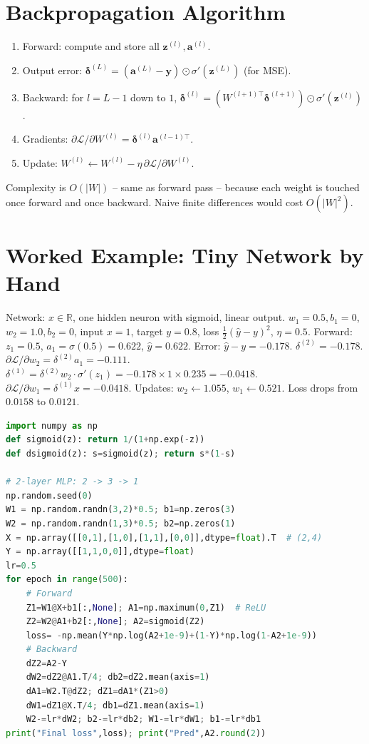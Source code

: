 \section{Backpropagation Algorithm}
\begin{enumerate}[leftmargin=1.2em]
\item Forward: compute and store all $\mathbf{z}^{(l)},\mathbf{a}^{(l)}$.
\item Output error: $\boldsymbol{\delta}^{(L)} = (\mathbf{a}^{(L)}-\mathbf{y})\odot\sigma'(\mathbf{z}^{(L)})$ (for MSE).
\item Backward: for $l=L-1$ down to $1$, $\boldsymbol{\delta}^{(l)}=(W^{(l+1)\top}\boldsymbol{\delta}^{(l+1)})\odot\sigma'(\mathbf{z}^{(l)})$.
\item Gradients: $\partial\mathcal{L}/\partial W^{(l)}=\boldsymbol{\delta}^{(l)}\mathbf{a}^{(l-1)\top}$.
\item Update: $W^{(l)}\leftarrow W^{(l)}-\eta\,\partial\mathcal{L}/\partial W^{(l)}$.
\end{enumerate}

Complexity is $O(|W|)$ -- same as forward pass -- because each weight is touched once forward and once backward. Naive finite differences would cost $O(|W|^2)$.

\section{Worked Example: Tiny Network by Hand}
Network: $x\in\mathbb{R}$, one hidden neuron with sigmoid, linear output. $w_1=0.5,b_1=0$, $w_2=1.0,b_2=0$, input $x=1$, target $y=0.8$, loss $\tfrac12(\hat y-y)^2$, $\eta=0.5$. Forward: $z_1=0.5$, $a_1=\sigma(0.5)=0.622$, $\hat y=0.622$. Error: $\hat y-y=-0.178$. $\delta^{(2)}=-0.178$. $\partial\mathcal{L}/\partial w_2=\delta^{(2)}a_1=-0.111$. $\delta^{(1)}=\delta^{(2)}w_2\cdot\sigma'(z_1)=-0.178\times1\times0.235=-0.0418$. $\partial\mathcal{L}/\partial w_1=\delta^{(1)}x=-0.0418$. Updates: $w_2\leftarrow1.055$, $w_1\leftarrow0.521$. Loss drops from $0.0158$ to $0.0121$.

\begin{example}
\begin{lstlisting}[language=Python]
import numpy as np
def sigmoid(z): return 1/(1+np.exp(-z))
def dsigmoid(z): s=sigmoid(z); return s*(1-s)

# 2-layer MLP: 2 -> 3 -> 1
np.random.seed(0)
W1 = np.random.randn(3,2)*0.5; b1=np.zeros(3)
W2 = np.random.randn(1,3)*0.5; b2=np.zeros(1)
X = np.array([[0,1],[1,0],[1,1],[0,0]],dtype=float).T  # (2,4)
Y = np.array([[1,1,0,0]],dtype=float)
lr=0.5
for epoch in range(500):
    # Forward
    Z1=W1@X+b1[:,None]; A1=np.maximum(0,Z1)  # ReLU
    Z2=W2@A1+b2[:,None]; A2=sigmoid(Z2)
    loss= -np.mean(Y*np.log(A2+1e-9)+(1-Y)*np.log(1-A2+1e-9))
    # Backward
    dZ2=A2-Y
    dW2=dZ2@A1.T/4; db2=dZ2.mean(axis=1)
    dA1=W2.T@dZ2; dZ1=dA1*(Z1>0)
    dW1=dZ1@X.T/4; db1=dZ1.mean(axis=1)
    W2-=lr*dW2; b2-=lr*db2; W1-=lr*dW1; b1-=lr*db1
print("Final loss",loss); print("Pred",A2.round(2))
\end{lstlisting}
\end{example}

